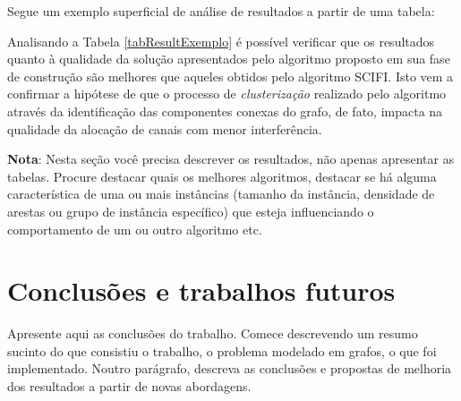 \documentclass[12pt,fleqn]{article}
\begin{document}
Segue um exemplo superficial de análise de resultados a partir de uma tabela:

Analisando a Tabela \ref{tabResultExemplo} é possível verificar que os resultados quanto à qualidade da solução apresentados pelo algoritmo proposto em sua fase de construção são melhores que aqueles obtidos pelo algoritmo SCIFI. Isto vem a confirmar a hipótese de que o processo de \textit{clusterização} realizado pelo algoritmo através da identificação das componentes conexas do grafo, de fato, impacta na qualidade da alocação de canais com menor interferência.


\textbf{Nota}: Nesta seção você precisa descrever os resultados, não apenas apresentar as tabelas. Procure destacar quais os melhores algoritmos, destacar se há alguma característica de uma ou mais instâncias (tamanho da instância, densidade de arestas ou grupo de instância específico) que esteja influenciando o comportamento de um ou outro algoritmo etc. 


\section{Conclusões e trabalhos futuros}
\label{secConclusoes}

Apresente aqui as conclusões do trabalho. Comece descrevendo um resumo sucinto do que consistiu o trabalho, o problema modelado em grafos, o que foi implementado. Noutro parágrafo, descreva as conclusões e propostas de melhoria dos resultados a partir de novas abordagens.





\appendix
\end{document}
